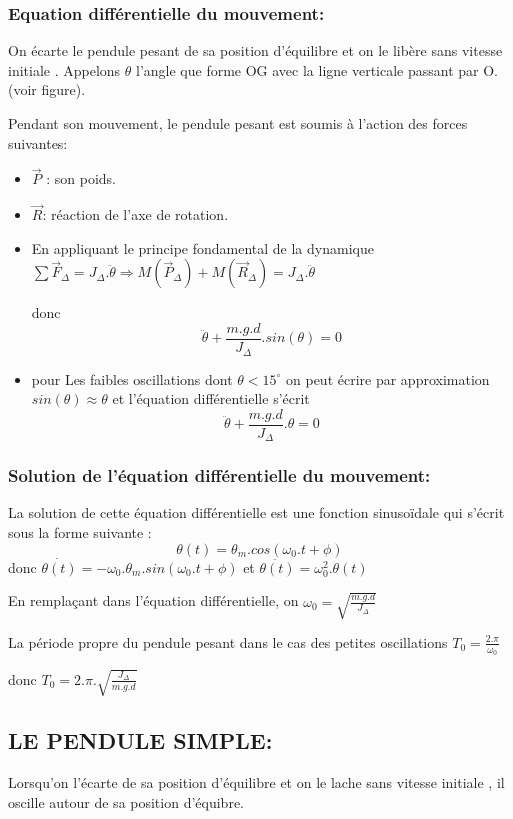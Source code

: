 \documentclass[12pt]{article}
\begin{document}
  \subsubsection{Equation différentielle du mouvement: }
On écarte le pendule pesant de sa position d'équilibre et on le libère sans vitesse initiale . Appelons $\theta$ l'angle que forme OG avec la ligne verticale passant par O.(voir figure).

Pendant son mouvement, le pendule pesant est soumis à l'action des forces suivantes:

\begin{itemize}
	\item $\vec{P}$ : son poids.
\item $\vec{R}$: réaction de l'axe de rotation.
\item En appliquant le principe fondamental de la dynamique $\sum{\vec{F}_{\Delta}} = J_{\Delta}.\ddot{\theta} \Rightarrow M(\vec{P}_{\Delta}) + M(\vec{R}_{\Delta}) = J_{\Delta}.\ddot{\theta}$

	donc $$\ddot{\theta} + \frac{m.g.d}{J_{\Delta}}.sin(\theta) = 0$$
\item pour Les faibles oscillations dont $\theta < 15^{\circ}$ on peut écrire par approximation $sin(\theta) \approx \theta$ et l'équation différentielle s'écrit $$\ddot{\theta} + \frac{m.g.d}{J_{\Delta}}.\theta = 0$$ 
\end{itemize}

\subsubsection{Solution de l'équation différentielle du mouvement: }
La solution de cette équation différentielle est une fonction sinusoïdale qui s'écrit sous la forme suivante : $$\theta(t) = \theta_m.cos(\omega_0.t + \phi)$$
donc $\dot{ \theta(t) }= -\omega_0.\theta_m.sin(\omega_0.t + \phi)$ et $\ddot{\theta(t)} = \omega_0^2.\theta(t)$

En remplaçant dans l'équation différentielle, on $\omega_0 = \sqrt{\frac{m.g.d}{J_{\Delta}}}$

La période propre du pendule pesant dans le cas des petites oscillations $T_0 = \frac{2.\pi}{\omega_0}$

donc $T_0 = 2.\pi.\sqrt{\frac{J_{\Delta}}{m.g.d}}$

\subsection{LE PENDULE SIMPLE: }
Lorsqu'on l'écarte de sa position d'équilibre et on le lache sans vitesse initiale , il oscille autour de sa position d'équibre. 
\end{document}
